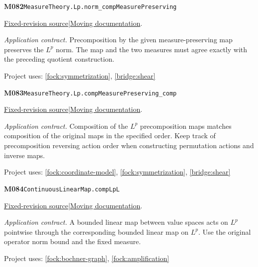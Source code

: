 \documentclass[11pt,a4paper]{article}
\theoremstyle{definition}
\theoremstyle{remark}
\begin{document}
\noindent\textbf{M082}\label{base:M082}\quad\nolinkurl{MeasureTheory.Lp.norm_compMeasurePreserving}

\href{https://github.com/leanprover-community/mathlib4/blob/9bac2d0692944a775113f7c130fd5e5b4608a854/Mathlib/MeasureTheory/Function/LpSpace/Basic.lean}{Fixed-revision source}\quad|\quad\href{https://leanprover-community.github.io/mathlib4_docs/Mathlib/MeasureTheory/Function/LpSpace/Basic.html#MeasureTheory.Lp.norm_compMeasurePreserving}{Moving documentation}.\par
\noindent\textit{Application contract.} Precomposition by the given measure-preserving map preserves the $L^p$ norm. The map and the two measures must agree exactly with the preceding quotient construction.\par
{\small Project uses: \ref{fock:symmetrization}, \ref{bridge:shear}}\par\medskip

\noindent\textbf{M083}\label{base:M083}\quad\nolinkurl{MeasureTheory.Lp.compMeasurePreserving_comp}

\href{https://github.com/leanprover-community/mathlib4/blob/9bac2d0692944a775113f7c130fd5e5b4608a854/Mathlib/MeasureTheory/Function/LpSpace/Basic.lean}{Fixed-revision source}\quad|\quad\href{https://leanprover-community.github.io/mathlib4_docs/Mathlib/MeasureTheory/Function/LpSpace/Basic.html#MeasureTheory.Lp.compMeasurePreserving_comp}{Moving documentation}.\par
\noindent\textit{Application contract.} Composition of the $L^p$ precomposition maps matches composition of the original maps in the specified order. Keep track of precomposition reversing action order when constructing permutation actions and inverse maps.\par
{\small Project uses: \ref{fock:coordinate-model}, \ref{fock:symmetrization}, \ref{bridge:shear}}\par\medskip

\noindent\textbf{M084}\label{base:M084}\quad\nolinkurl{ContinuousLinearMap.compLpL}

\href{https://github.com/leanprover-community/mathlib4/blob/9bac2d0692944a775113f7c130fd5e5b4608a854/Mathlib/MeasureTheory/Function/LpSpace/Basic.lean}{Fixed-revision source}\quad|\quad\href{https://leanprover-community.github.io/mathlib4_docs/Mathlib/MeasureTheory/Function/LpSpace/Basic.html#ContinuousLinearMap.compLpL}{Moving documentation}.\par
\noindent\textit{Application contract.} A bounded linear map between value spaces acts on $L^p$ pointwise through the corresponding bounded linear map on $L^p$. Use the original operator norm bound and the fixed measure.\par
{\small Project uses: \ref{fock:bochner-graph}, \ref{fock:amplification}}\par\medskip
\end{document}

